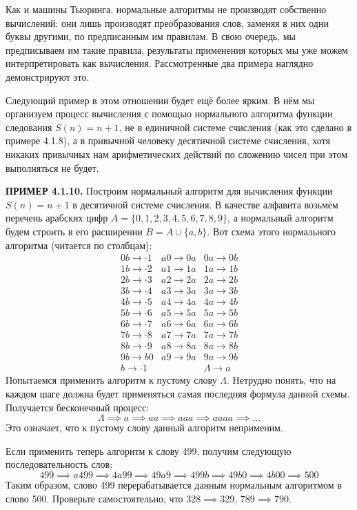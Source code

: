 \documentclass[a4paper,12pt]{article}
\begin{document}
Как и машины Тьюринга, нормальные алгоритмы не производят собственно вычислений: они лишь производят преобразования слов, заменяя в них одни буквы другими, по предписанным им правилам. В свою очередь, мы предписываем им такие правила, результаты применения которых мы уже можем интерпретировать как вычисления. Рассмотренные два примера наглядно демонстрируют это.

Следующий пример в этом отношении будет ещё более ярким. В нём мы организуем процесс вычисления с помощью нормального алгоритма функции следования \(S(n) = n + 1\), не в единичной системе счисления (как это сделано в примере 4.1.8), а в привычной человеку десятичной системе счисления, хотя никаких привычных нам арифметических действий по сложению чисел при этом выполняться не будет.

\textbf{ПРИМЕР 4.1.10.} Построим нормальный алгоритм для вычисления функции \(S(n) = n + 1\) в десятичной системе счисления. В качестве алфавита возьмём перечень арабских цифр \(A = \{0, 1, 2, 3, 4, 5, 6, 7, 8, 9\}\), а нормальный алгоритм будем строить в его расширении \(B = A \cup \{a, b\}\). Вот схема этого нормального алгоритма (читается по столбцам):
\[
\begin{array}{lll}
0b \to \cdot 1 & a0 \to 0a & 0a \to 0b \\
1b \to \cdot 2 & a1 \to 1a & 1a \to 1b \\
2b \to \cdot 3 & a2 \to 2a & 2a \to 2b \\
3b \to \cdot 4 & a3 \to 3a & 3a \to 3b \\
4b \to \cdot 5 & a4 \to 4a & 4a \to 4b \\
5b \to \cdot 6 & a5 \to 5a & 5a \to 5b \\
6b \to \cdot 7 & a6 \to 6a & 6a \to 6b \\
7b \to \cdot 8 & a7 \to 7a & 7a \to 7b \\
8b \to \cdot 9 & a8 \to 8a & 8a \to 8b \\
9b \to b0 & a9 \to 9a & 9a \to 9b \\
b \to \cdot 1 & & \Lambda \to a
\end{array}
\]
Попытаемся применить алгоритм к пустому слову \(\Lambda\). Нетрудно понять, что на каждом шаге должна будет применяться самая последняя формула данной схемы. Получается бесконечный процесс:
\[
\Lambda \implies a \implies aa \implies aaa \implies aaaa \implies \dots
\]
Это означает, что к пустому слову данный алгоритм неприменим.

Если применить теперь алгоритм к слову 499, получим следующую последовательность слов:
\[
499 \implies a499 \implies 4a99 \implies 49a9 \implies 499b \implies 49b0 \implies 4b00 \implies 500
\]
Таким образом, слово 499 перерабатывается данным нормальным алгоритмом в слово 500. Проверьте самостоятельно, что \(328 \implies 329\), \(789 \implies 790\).
\end{document}
